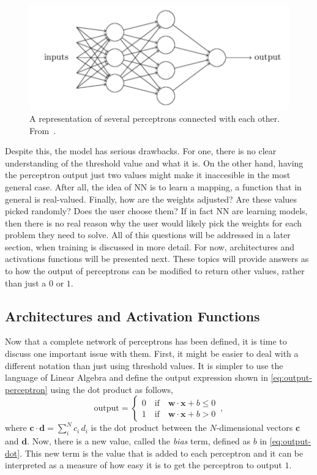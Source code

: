 \begin{figure}
    \centering
    \includegraphics[scale=0.4]{figuras/capitulo-3/multi-perceptron}
    \caption{A representation of several perceptrons connected with each other. From~\cite{nielsenNeuralNetworksDeep2015}.}
    \label{fig:multi-perceptron}
\end{figure}

Despite this, the model has serious drawbacks. For one, 
there is no clear understanding of the threshold value and what it is. On the other hand, 
having the perceptron output just two values might make it inaccesible in the most general 
case. After all, the idea of NN is to learn a mapping, a function that in general is 
real-valued. Finally, how are the weights adjusted? Are these values picked randomly? Does 
the user choose them? If in fact NN are learning models, then there is no real reason why 
the user would likely pick the weights for each problem they need to solve. All of this 
questions will be addressed in a later section, when training is discussed in more detail.
For now, architectures and activations functions will be presented next. These topics will
provide answers as to how the output of perceptrons can be modified to return other values,
rather than just a \(0\) or \(1\).

\subsection{Architectures and Activation Functions}
Now that a complete network of perceptrons has been defined, it is time to discuss one 
important issue with them. First, it might be easier to deal with a different notation 
than just using threshold values. It is simpler to use the language of Linear Algebra 
and define the output expression shown in \autoref{eq:output-perceptron} using the dot product as follows,
\begin{equation}
    \text{output} = \begin{cases}
        0 \quad \text{if} \quad \bm{w} \cdot \bm{x} + b \leq 0 \\
        1 \quad \text{if} \quad \bm{w} \cdot \bm{x} + b > 0
    \end{cases}
    \, ,
    \label{eq:output-dot}
\end{equation}
where \(\bm{c} \cdot \bm{d} = \sum_{i}^{N} c_i \, d_i\) is the dot product between 
the $N$-dimensional vectors \(\bm{c}\) and \(\bm{d}\). Now, there is a new value, 
called the \emph{bias} term, defined as \(b\) in \autoref{eq:output-dot}. This new term is 
the value that is added to each perceptron and it can be interpreted as a measure of how 
easy it is to get the perceptron to output \(1\).

